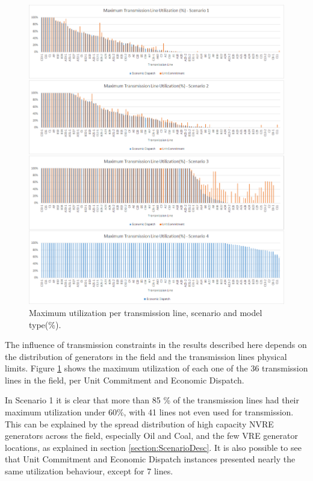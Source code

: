 \documentclass[12pt,LUDisStyle,twosided]{book}
\begin{document}
\begin{figure}[H] 
  \centering
  
	  \includegraphics[width=\textwidth,height=\textheight,keepaspectratio]{MaximumTransmissionLineUtilization.png}
  
  \caption{Maximum utilization per transmission line, scenario and model type(\%).}
  \label{fig:maximumutilizaton}
\end{figure}

The influence of transmission constraints in the results described here depends on the distribution of generators in the field and the transmission lines physical limits. Figure \ref{fig:maximumutilizaton} shows the maximum utilization of each one of the 36 transmission lines in the field, per Unit Commitment and Economic Dispatch. 

In Scenario 1 it is clear that more than 85 \% of the transmission lines had their maximum utilization under 60\%, with 41 lines not even used for transmission.  This can be explained by the spread distribution of high capacity NVRE generators across the field, especially Oil and Coal, and the few VRE generator locations, as explained in section    \ref{section:ScenarioDesc}. It is also possible to see that Unit Commitment and Economic Dispatch instances presented nearly the same utilization behaviour, except for 7 lines. 
\end{document}

